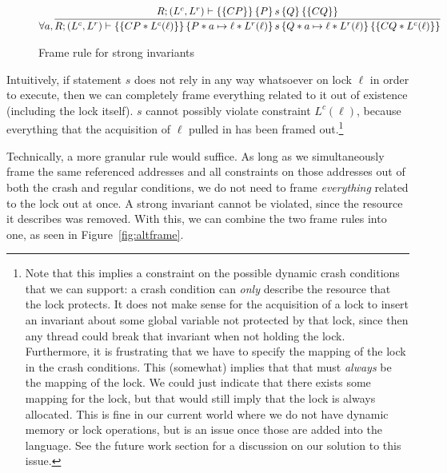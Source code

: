 \begin{figure*}
\begin{gather*}
    \forall a, \infer
	{\hoarestmt{R}{(L^c,L^r)}{CP * L^c(\ell)}{P * a \mapsto \ell * L^r(\ell)}{s}{Q * a \mapsto \ell * L^r(\ell)}{CQ * L^c(\ell)}}
	{\hoarestmt{R}{(L^c,L^r)}{CP}{P}{s}{Q}{CQ}}
\end{gather*}
\caption{Frame rule for strong invariants}
\label{fig:stronginv}
\end{figure*}

Intuitively, if statement $s$ does not rely in any way whatsoever on lock $\ell$
in order to execute, then we can completely frame everything related to it out
of existence (including the lock itself). $s$ cannot possibly violate constraint
$L^c(\ell)$, because everything that the acquisition of $\ell$ pulled in has
been framed out.\footnote{Note that this implies a constraint on the possible
dynamic crash conditions that we can support: a crash condition can
\textit{only} describe the resource that the lock protects. It does not make
sense for the acquisition of a lock to insert an invariant about some global
variable not protected by that lock, since then any thread could break that
invariant when not holding the lock. Furthermore, it is frustrating that we have
to specify the mapping of the lock in the crash conditions. This (somewhat)
implies that that must \textit{always} be the mapping of the lock. We could just
indicate that there exists some mapping for the lock, but that would still imply
that the lock is always allocated. This is fine in our current world where we
do not have dynamic memory or lock operations, but is an issue once those are
added into the language. See the future work section for a discussion on our
solution to this issue.}

Technically, a more granular rule would suffice. As long as we simultaneously
frame the same referenced addresses and all constraints on those addresses out
of both the crash and regular conditions, we do not need to frame
\textit{everything} related to the lock out at once. A strong invariant cannot
be violated, since the resource it describes was removed. With this, we can
combine the two frame rules into one, as seen in Figure~\ref{fig:altframe}.



